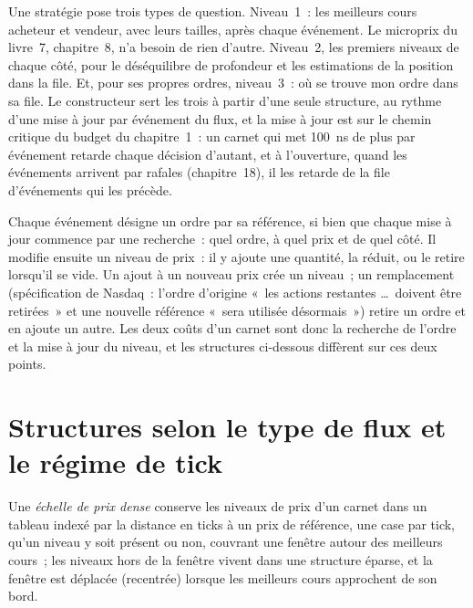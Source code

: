 Une stratégie pose trois types de question. Niveau~1~: les meilleurs cours acheteur et vendeur, avec leurs tailles, après chaque événement. Le microprix du
livre~7, chapitre~8, n'a besoin de rien d'autre. Niveau~2, les premiers niveaux de chaque côté, pour le déséquilibre de profondeur et les estimations de
la position dans la file. Et, pour ses propres ordres, niveau~3~: où se trouve mon ordre dans sa file. Le constructeur sert les trois à partir d'une seule structure,
au rythme d'une mise à jour par événement du flux, et la mise à jour est sur le chemin critique du budget du chapitre~1~: un carnet qui
met \qty{100}{\nano\second} de plus par événement retarde chaque décision d'autant, et à l'ouverture, quand les événements arrivent
par rafales (chapitre~18), il les retarde de la file d'événements qui les précède.

Chaque événement désigne un ordre par sa référence, si bien que chaque mise à jour commence par une recherche~: quel ordre, à quel prix et de quel côté.
Il modifie ensuite un niveau de prix~: il y ajoute une quantité, la réduit, ou le retire lorsqu'il se vide. Un ajout à un nouveau prix crée un niveau~;
un remplacement (spécification de Nasdaq~: l'ordre d'origine «~les actions restantes \dots\ doivent être retirées~» et une nouvelle référence
«~sera utilisée désormais~») retire un ordre et en ajoute un autre. Les deux coûts d'un carnet sont donc la recherche de l'ordre et la
mise à jour du niveau, et les structures ci-dessous diffèrent sur ces deux points.

\section{Structures selon le type de flux et le régime de tick}

\begin{definition}\label{def:ll:the-order-book-builder:ladder}
Une \emph{échelle de prix dense} conserve les niveaux de prix d'un carnet dans un tableau indexé par la distance en ticks à un prix
de référence, une case par tick, qu'un niveau y soit présent ou non, couvrant une fenêtre autour des meilleurs cours~; les niveaux hors de la fenêtre
vivent dans une structure éparse, et la fenêtre est déplacée (recentrée) lorsque les meilleurs cours approchent de son bord.
\end{definition}

